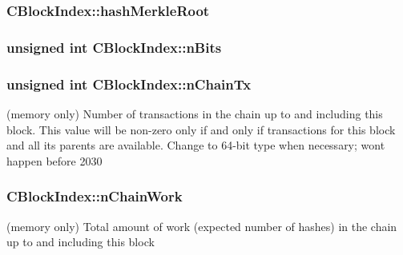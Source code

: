 \subsubsection[{hash\+Merkle\+Root}]{ C\+Block\+Index\+::hash\+Merkle\+Root}\label{class_c_block_index_a0601b6b2bd6eaedfbc283c00d045a21c}
\hypertarget{class_c_block_index_a3324894e6af612d1bd76f89378435713}{}
\subsubsection[{n\+Bits}]{\setlength{\rightskip}{0pt plus 5cm}unsigned int C\+Block\+Index\+::n\+Bits}\label{class_c_block_index_a3324894e6af612d1bd76f89378435713}
\hypertarget{class_c_block_index_af3c6d6dd8a7579e5ce516d94b98d2db5}{}
\subsubsection[{n\+Chain\+Tx}]{\setlength{\rightskip}{0pt plus 5cm}unsigned int C\+Block\+Index\+::n\+Chain\+Tx}\label{class_c_block_index_af3c6d6dd8a7579e5ce516d94b98d2db5}
(memory only) Number of transactions in the chain up to and including this block. This value will be non-\/zero only if and only if transactions for this block and all its parents are available. Change to 64-\/bit type when necessary; won\textquotesingle{}t happen before 2030 \hypertarget{class_c_block_index_a31e65c1f491d438dfdcd8d92bdfa73a1}{}
\subsubsection[{n\+Chain\+Work}]{ C\+Block\+Index\+::n\+Chain\+Work}\label{class_c_block_index_a31e65c1f491d438dfdcd8d92bdfa73a1}


(memory only) Total amount of work (expected number of hashes) in the chain up to and including this block 

\hypertarget{class_c_block_index_af164283dfb2d62ac44be8d10446bce4a}{}
